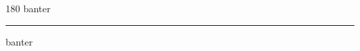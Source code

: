 
\begin{frame}
\begin{center}
\begin{turn}{180}
{\fontsize{2.5cm}{1em}\selectfont banter}
\end{turn}
\vspace{1em}\par  
\hrule
\vspace{1em}\par  
{\fontsize{2.5cm}{1em}\selectfont banter}
\end{center}
\end{frame}
